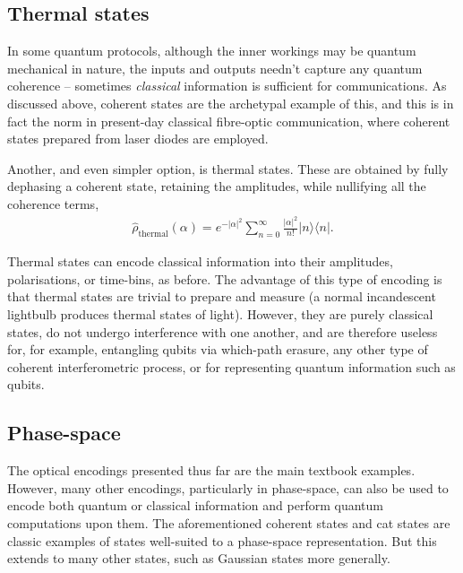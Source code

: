 \documentclass[aps,rmp,twocolumn,amsmath,amssymb,nofootinbib,superscriptaddress,longbibliography,floatfix,table-of-contents,eqsecnum]{revtex4-1}
\newcommand{\bra}[1]{\langle#1|}
\newcommand{\ket}[1]{|#1\rangle}
\begin{document}
%
%

\subsection{Thermal states} 

In some quantum protocols, although the inner workings may be quantum mechanical in nature, the inputs and outputs needn't capture any quantum coherence -- sometimes \textit{classical} information is sufficient for communications. As discussed above, coherent states are the archetypal example of this, and this is in fact the norm in present-day classical fibre-optic communication, where coherent states prepared from laser diodes are employed.

Another, and even simpler option, is thermal states. These are obtained by fully dephasing a coherent state, retaining the amplitudes, while nullifying all the coherence terms,
\begin{align}
\hat\rho_\text{thermal}(\alpha) = e^{-|\alpha|^2} \sum_{n=0}^\infty \frac{|\alpha|^2}{n!}\ket{n}\bra{n}.
\end{align}

Thermal states can encode classical information into their amplitudes, polarisations, or time-bins, as before. The advantage of this type of encoding is that thermal states are trivial to prepare and measure (a normal incandescent lightbulb produces thermal states of light). However, they are purely classical states, do not undergo interference with one another, and are therefore useless for, for example, entangling qubits via which-path erasure, any other type of coherent interferometric process, or for representing quantum information such as qubits.

%
%

\subsection{Phase-space} \label{sec:exotic} 

The optical encodings presented thus far are the main textbook examples. However, many other encodings, particularly in phase-space, can also be used to encode both quantum or classical information and perform quantum computations upon them. The aforementioned coherent states and cat states are classic examples of states well-suited to a phase-space representation. But this extends to many other states, such as Gaussian states more generally.
\end{document}
